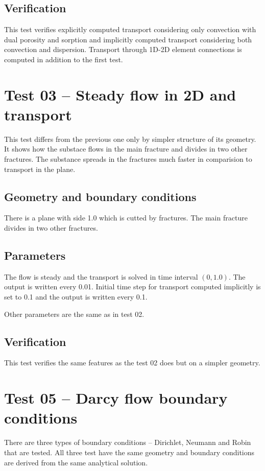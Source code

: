 \subsection*{Verification}
This test verifies explicitly computed transport considering only convection with dual porosity and sorption and implicitly computed transport considering both convection and dispersion. Transport through 1D-2D element connections is computed in addition to the first test.




\section{Test 03 -- Steady flow in 2D and transport}
\label{sec:test03}
This test differs from the previous one only by simpler structure of its geometry. It shows how the substace flows in the main fracture and divides in two other fractures. The substance spreads in the fractures much faster in comparision to transport in the plane.
\subsection*{Geometry and boundary conditions}
There is a plane with side 1.0 which is cutted by fractures. The main fracture divides in two other fractures.
\subsection*{Parameters}
The flow is steady and the transport is solved in time interval $(0,1.0)$. The output is written every 0.01. Initial time step for transport computed implicitly is set to 0.1 and the output is written every 0.1.

Other parameters are the same as in test 02.
\subsection*{Verification}
This test verifies the same features as the test 02 does but on a simpler geometry.




\section{Test 05 -- Darcy flow boundary conditions}
\label{sec:test05}
There are three types of boundary conditions -- Dirichlet, Neumann and Robin that are tested. All three test have the same geometry and boundary conditions are derived from the same analytical solution.


